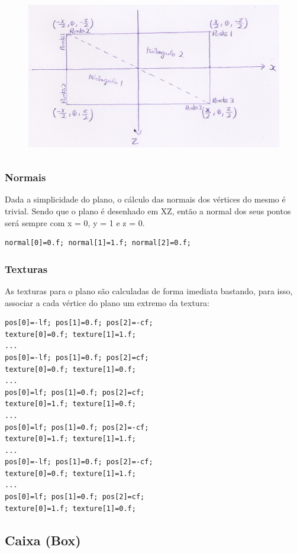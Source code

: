 \documentclass{article}
\begin{document}
\begin{figure}[H]
\centering
\includegraphics[height=7cm]{planeMath.png}
\end{figure}

\subsubsection{Normais}
Dada a simplicidade do plano, o cálculo das normais dos vértices do mesmo é trivial. Sendo que o plano é desenhado em XZ, então a normal dos seus pontos será sempre com x = 0, y = 1 e z = 0.
\begin{verbatim}
normal[0]=0.f; normal[1]=1.f; normal[2]=0.f;
\end{verbatim}

\subsubsection{Texturas}
As texturas para o plano são calculadas de forma imediata bastando, para isso, associar a cada vértice do plano um extremo da textura:

\begin{verbatim}
pos[0]=-lf; pos[1]=0.f; pos[2]=-cf;
texture[0]=0.f; texture[1]=1.f;
...
pos[0]=-lf; pos[1]=0.f; pos[2]=cf;
texture[0]=0.f; texture[1]=0.f;
...
pos[0]=lf; pos[1]=0.f; pos[2]=cf;
texture[0]=1.f; texture[1]=0.f;
...
pos[0]=lf; pos[1]=0.f; pos[2]=-cf;
texture[0]=1.f; texture[1]=1.f;
...
pos[0]=-lf; pos[1]=0.f; pos[2]=-cf;
texture[0]=0.f; texture[1]=1.f;
...
pos[0]=lf; pos[1]=0.f; pos[2]=cf;
texture[0]=1.f; texture[1]=0.f;
\end{verbatim}

\subsection{Caixa (Box)}
\end{document}
